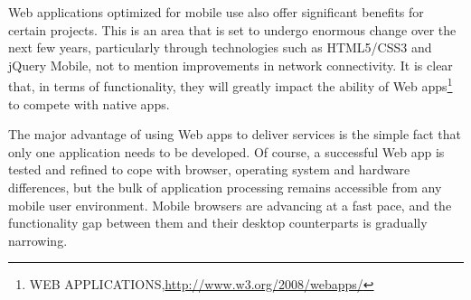 Web applications optimized for mobile use also offer significant benefits for certain projects. This is an area that is set to undergo enormous change over the next few years, particularly through technologies such as HTML5/CSS3 and jQuery Mobile, not to mention improvements in network connectivity. It is clear that, in terms of functionality, they will greatly impact the ability of Web apps\footnote{WEB APPLICATIONS,\url{http://www.w3.org/2008/webapps/}} to compete with native apps.

The major advantage of using Web apps to deliver services is the simple fact that only one application needs to be developed. Of course, a successful Web app is tested and refined to cope with browser, operating system and hardware differences, but the bulk of application processing remains accessible from any mobile user environment. Mobile browsers are advancing at a fast pace, and the functionality gap between them and their desktop counterparts is gradually narrowing.

